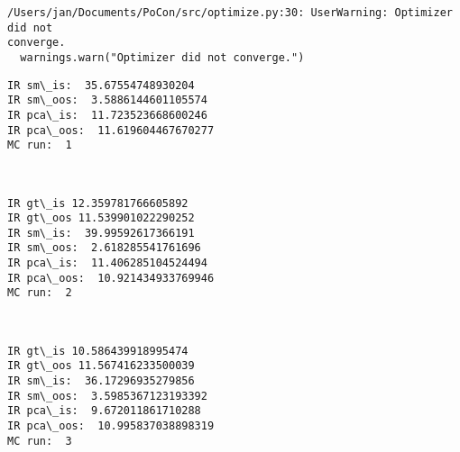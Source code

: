 \documentclass[11pt]{article}
\begin{document}
    \begin{Verbatim}[commandchars=\\\{\},fontsize=\footnotesize]
/Users/jan/Documents/PoCon/src/optimize.py:30: UserWarning: Optimizer did not
converge.
  warnings.warn("Optimizer did not converge.")

    \end{Verbatim}

    \begin{Verbatim}[commandchars=\\\{\},fontsize=\footnotesize]
IR sm\_is:  35.67554748930204
IR sm\_oos:  3.5886144601105574
IR pca\_is:  11.723523668600246
IR pca\_oos:  11.619604467670277
MC run:  1

    \end{Verbatim}

    \begin{center}
    \end{center}
    { \hspace*{\fill} \\}
    
    \begin{Verbatim}[commandchars=\\\{\},fontsize=\footnotesize]
IR gt\_is 12.359781766605892
IR gt\_oos 11.539901022290252
IR sm\_is:  39.99592617366191
IR sm\_oos:  2.618285541761696
IR pca\_is:  11.406285104524494
IR pca\_oos:  10.921434933769946
MC run:  2

    \end{Verbatim}

    \begin{center}
    \end{center}
    { \hspace*{\fill} \\}
    
    \begin{Verbatim}[commandchars=\\\{\},fontsize=\footnotesize]
IR gt\_is 10.586439918995474
IR gt\_oos 11.567416233500039
IR sm\_is:  36.17296935279856
IR sm\_oos:  3.5985367123193392
IR pca\_is:  9.672011861710288
IR pca\_oos:  10.995837038898319
MC run:  3

    \end{Verbatim}

    \begin{center}
    \end{center}
    { \hspace*{\fill} \\}
    
\end{document}
